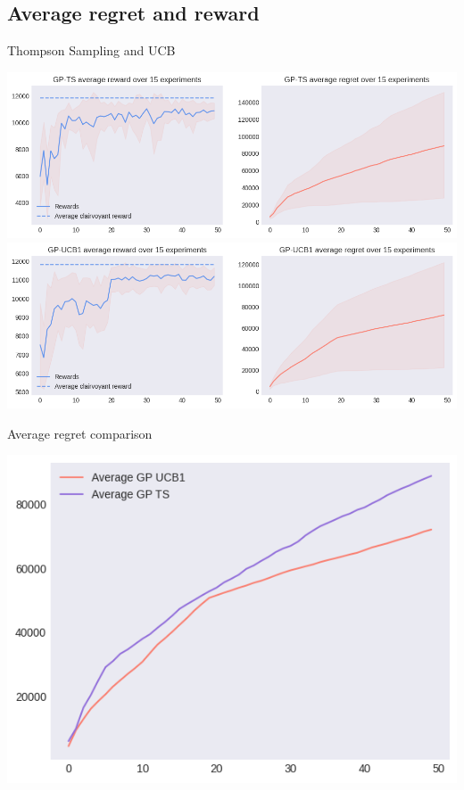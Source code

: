 \subsection{Average regret and reward}

Thompson Sampling and UCB

\begin{center}
	\includegraphics[scale=0.4]{img/Graphs/uncertain_alpha_unit/image4.png}
	\includegraphics[scale=0.4]{img/Graphs/uncertain_alpha_unit/image5.png}
\end{center}

Average regret comparison

\begin{center}
	\includegraphics[scale=0.45]{img/Graphs/uncertain_alpha_unit/image6.png}
\end{center}

